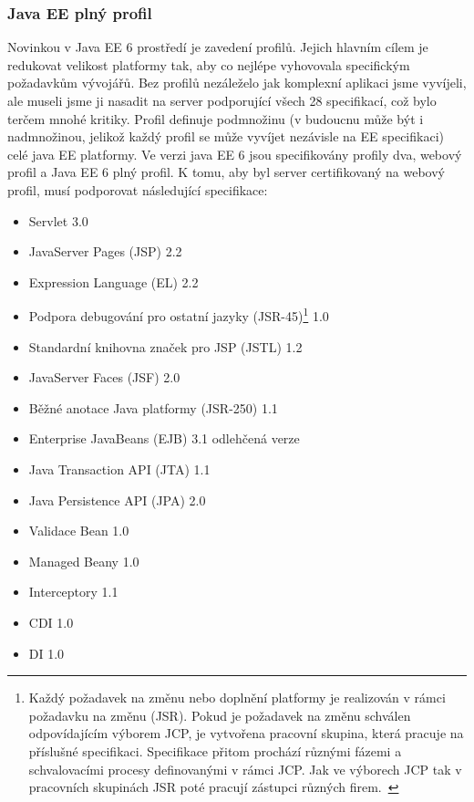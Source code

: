 \documentclass[122pt,oneside]{fithesis}
\begin{document}
\subsubsection{Java EE plný profil}
\label{profily}
Novinkou v Java EE 6 prostředí je zavedení profilů. Jejich hlavním cílem je redukovat velikost platformy tak, aby co nejlépe vyhovovala specifickým požadavkům vývojářů. Bez profilů nezáleželo jak komplexní aplikaci jsme vyvíjeli, ale museli jsme ji nasadit na server podporující všech 28 specifikací, což bylo terčem mnohé kritiky. Profil definuje podmnožinu (v budoucnu může být i nadmnožinou, jelikož každý profil se může vyvíjet nezávisle na EE specifikaci) celé java EE platformy. Ve verzi java EE 6 jsou specifikovány profily dva, webový profil a Java EE 6 plný profil. K tomu, aby byl server certifikovaný na webový profil, musí podporovat následující specifikace:
\begin{itemize}
  \item Servlet 3.0
  \item JavaServer Pages (JSP) 2.2
  \item Expression Language (EL) 2.2
  \item Podpora debugování pro ostatní jazyky (JSR-45)\footnote{Každý požadavek na změnu nebo doplnění platformy je realizován v rámci požadavku na změnu (JSR). Pokud je požadavek na změnu schválen odpovídajícím výborem JCP, je vytvořena pracovní skupina, která pracuje na příslušné specifikaci. Specifikace přitom prochází různými fázemi a schvalovacími procesy definovanými v rámci JCP. Jak ve výborech JCP tak v pracovních skupinách JSR poté pracují zástupci různých firem.~\cite{wikiJSR}} 1.0
  \item Standardní knihovna značek pro JSP (JSTL) 1.2
  \item JavaServer Faces (JSF) 2.0
  \item Běžné anotace Java platformy (JSR-250) 1.1
  \item Enterprise JavaBeans (EJB) 3.1 odlehčená verze
  \item Java Transaction API (JTA) 1.1
  \item Java Persistence API (JPA) 2.0
  \item Validace Bean 1.0
  \item Managed Beany 1.0
  \item Interceptory 1.1
  \item CDI 1.0
  \item DI 1.0
\end{itemize}
\end{document}

